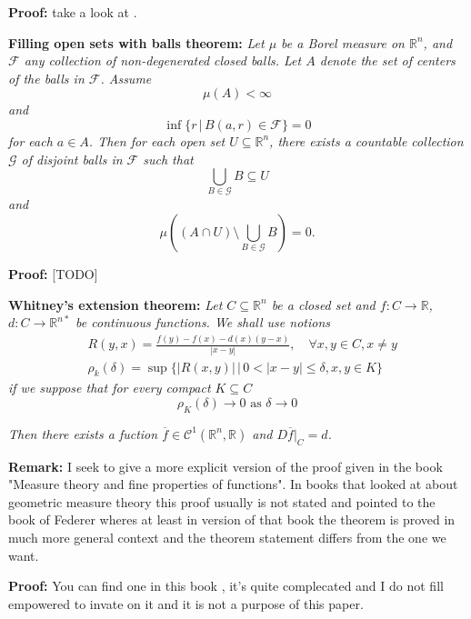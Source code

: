 \documentclass{article}
\begin{document}
\vspace{1ex}
\textbf{Proof:} take a look at \cite{evans_gariepy}.

\vspace{2ex}
\textbf{Filling open sets with balls theorem:} \textit{Let $\mu$ be a Borel measure on
$\mathbb{R}^n$, and $\mathcal{F}$ any collection of non-degenerated closed balls.
Let $A$ denote the set of centers of the balls in $\mathcal F$. Assume
\[\mu(A)<\infty\]
and
\[\inf\{r\,|\,B(a,r)\in\mathcal F\}=0\]
for each $a\in A$. Then for each open set $U\subseteq\mathbb{R}^n$, there
exists a countable collection $\mathcal G$ of disjoint balls in $\mathcal F$ such that
\[\bigcup_{B\in\mathcal G} B\subseteq U\]
and
\[\mu\left((A\cap U)\setminus\bigcup_{B\in\mathcal G}B\right)=0.\]}

\vspace{1ex}
\textbf{Proof:} [TODO]

\vspace{2ex}
\textbf{Whitney's extension theorem:}\textit{
Let $C\subseteq \mathbb{R}^n$ be a closed set and $f:C\rightarrow\mathbb R$,
$d:C\rightarrow\mathbb{R}^{n*}$ be continuous functions. We shall use notions}
\begin{align*}
    &R(y,x)=\frac{f(y)-f(x)-d(x)(y-x)}{|x-y|},\quad\forall x,y\in C, x\neq y \\
    &\rho_k(\delta)=\sup\{|R(x,y)|\, |\, 0<|x-y|\leq\delta, x, y\in K\}
\end{align*}
\textit{if we suppose that for every compact $K\subseteq C$}
\begin{equation}
\rho_K(\delta)\rightarrow 0\text{ as }\delta\rightarrow 0
\end{equation}

\textit{Then there exists a fuction $\overline f\in\mathcal{C}^1(\mathbb{R}^n,\mathbb{R})$
and $D\overline f|_C=d$.}

\vspace{1ex}
\textbf{Remark:}
I seek to give a more explicit version of the proof given in the book "Measure
theory and fine properties of functions". In books that looked at about
geometric measure theory this proof usually is not stated and pointed to the
book of Federer wheres at least in version of that book the theorem is proved
in much more general context and the theorem statement differs from the one we
want.

\vspace{1ex}
\textbf{Proof:} You can find one in this book \cite{evans_gariepy}, it's quite
complecated and I do not fill empowered to invate on it and it is not a purpose
of this paper.
\end{document}
